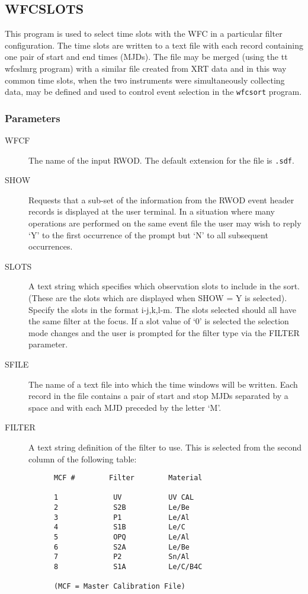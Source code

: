 \subsection{WFCSLOTS}
\label{sec:programs:wfcslots}

This program is used to select time slots with the WFC in a particular
filter configuration. The time slots are written to a text file with
each record containing one pair of start and end times (MJDs). The file
may be merged (using the {tt wfcslmrg} program) with a similar file created
from XRT data and in this way common time slots, when the two instruments
were simultaneously collecting data, may be defined and used to control
event selection in the {\tt wfcsort} program.

\subsubsection{Parameters}

\begin{description}

\item[WFCF]
The name of the input RWOD.  The default extension for the file is {\tt .sdf}.

\item[SHOW]
Requests that a sub-set of the information from the RWOD event header records
is displayed at the user terminal. In a situation where many
operations are performed on the same event file the user may wish to
reply `Y' to the first occurrence of the prompt but `N' to all subsequent
occurrences.

\item[SLOTS]
A text string which specifies which observation slots to include in
the sort. (These are the slots which are displayed when SHOW = Y is selected).
Specify the slots in the format i-j,k,l-m. The slots selected
should all have the same filter at the focus. If a slot value of `0' is
selected the selection mode changes and the user is prompted for the
filter type via the FILTER parameter.

\item[SFILE]
The name of a text file into which the time windows will be written.
Each record in the file contains a pair of start and stop MJDs
separated by a space and with each MJD preceded by the letter `M'.

\item[FILTER]
A text string definition of the filter to use. This is selected from
the second column of the following table:

\begin{verbatim}
      MCF #        Filter        Material

      1             UV           UV CAL
      2             S2B          Le/Be
      3             P1           Le/Al
      4             S1B          Le/C
      5             OPQ          Le/Al
      6             S2A          Le/Be
      7             P2           Sn/Al
      8             S1A          Le/C/B4C

      (MCF = Master Calibration File)
\end{verbatim}

\end{description}

